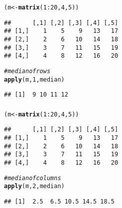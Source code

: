 \documentclass[12pt]{beamer}\usepackage[]{graphicx}\usepackage[]{color}
\makeatletter
\newcommand{\hlnum}[1]{\textcolor[rgb]{0.686,0.059,0.569}{#1}}%
\newcommand{\hlcom}[1]{\textcolor[rgb]{0.678,0.584,0.686}{\textit{#1}}}%
\newcommand{\hlopt}[1]{\textcolor[rgb]{0,0,0}{#1}}%
\newcommand{\hlstd}[1]{\textcolor[rgb]{0.345,0.345,0.345}{#1}}%
\newcommand{\hlkwb}[1]{\textcolor[rgb]{0.69,0.353,0.396}{#1}}%
\newcommand{\hlkwd}[1]{\textcolor[rgb]{0.737,0.353,0.396}{\textbf{#1}}}%
\newenvironment{kframe}{%
 \def\at@end@of@kframe{}%
 \ifinner\ifhmode%
  \def\at@end@of@kframe{\end{minipage}}%
  \begin{minipage}{\columnwidth}%
 \fi\fi%
 \def\FrameCommand##1{\hskip\@totalleftmargin \hskip-\fboxsep
 \colorbox{shadecolor}{##1}\hskip-\fboxsep
     \hskip-\linewidth \hskip-\@totalleftmargin \hskip\columnwidth}%
 \MakeFramed {\advance\hsize-\width
   \@totalleftmargin\z@ \linewidth\hsize
   \@setminipage}}%
 {\par\unskip\endMakeFramed%
 \at@end@of@kframe}
\newenvironment{knitrout}{}{} %
\makeatother
\begin{document}
\begin{frame}[fragile]
\frametitle{}

\begin{knitrout}\footnotesize
{}\color{fgcolor}\begin{kframe}
\begin{alltt}
\hlstd{(m} \hlkwb{<-} \hlkwd{matrix}\hlstd{(}\hlnum{1}\hlopt{:}\hlnum{20}\hlstd{,} \hlnum{4}\hlstd{,} \hlnum{5}\hlstd{))}
\end{alltt}
\begin{verbatim}
##      [,1] [,2] [,3] [,4] [,5]
## [1,]    1    5    9   13   17
## [2,]    2    6   10   14   18
## [3,]    3    7   11   15   19
## [4,]    4    8   12   16   20
\end{verbatim}
\begin{alltt}
\hlcom{# median of rows}
\hlkwd{apply}\hlstd{(m,} \hlnum{1}\hlstd{, median)}
\end{alltt}
\begin{verbatim}
## [1]  9 10 11 12
\end{verbatim}
\end{kframe}
\end{knitrout}

\end{frame}


\begin{frame}[fragile]
\frametitle{}

\begin{knitrout}\footnotesize
{}\color{fgcolor}\begin{kframe}
\begin{alltt}
\hlstd{(m} \hlkwb{<-} \hlkwd{matrix}\hlstd{(}\hlnum{1}\hlopt{:}\hlnum{20}\hlstd{,} \hlnum{4}\hlstd{,} \hlnum{5}\hlstd{))}
\end{alltt}
\begin{verbatim}
##      [,1] [,2] [,3] [,4] [,5]
## [1,]    1    5    9   13   17
## [2,]    2    6   10   14   18
## [3,]    3    7   11   15   19
## [4,]    4    8   12   16   20
\end{verbatim}
\begin{alltt}
\hlcom{# median of columns}
\hlkwd{apply}\hlstd{(m,} \hlnum{2}\hlstd{, median)}
\end{alltt}
\begin{verbatim}
## [1]  2.5  6.5 10.5 14.5 18.5
\end{verbatim}
\end{kframe}
\end{knitrout}

\end{frame}
\end{document}
